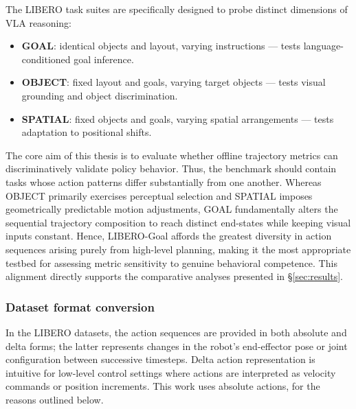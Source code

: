 \documentclass[english,12pt,a4paper,pdftex,elec,utf8]{aaltothesis}
\begin{document}
The LIBERO task suites are specifically designed to probe distinct dimensions of VLA reasoning:
\begin{itemize}
    \item \textbf{GOAL}: identical objects and layout, varying instructions --- tests language-conditioned goal inference.
    \item \textbf{OBJECT}: fixed layout and goals, varying target objects --- tests visual grounding and object discrimination.
    \item \textbf{SPATIAL}: fixed objects and goals, varying spatial arrangements --- tests adaptation to positional shifts.
\end{itemize}

The core aim of this thesis is to evaluate whether offline trajectory metrics can discriminatively validate policy behavior. Thus, the benchmark should contain tasks whose action patterns differ substantially from one another. Whereas OBJECT primarily exercises perceptual selection and SPATIAL imposes geometrically predictable motion adjustments, GOAL fundamentally alters the sequential trajectory composition to reach distinct end-states while keeping visual inputs constant. Hence, LIBERO-Goal affords the greatest diversity in action sequences arising purely from high-level planning, making it the most appropriate testbed for assessing metric sensitivity to genuine behavioral competence. This alignment directly supports the comparative analyses presented in \S\ref{sec:results}.

\subsubsection{Dataset format conversion}
In the LIBERO datasets, the action sequences are provided in both absolute and delta forms; the latter represents changes in the robot's end-effector pose or joint configuration between successive timesteps. Delta action representation is intuitive for low-level control settings where actions are interpreted as velocity commands or position increments. This work uses absolute actions, for the reasons outlined below.
\end{document}
